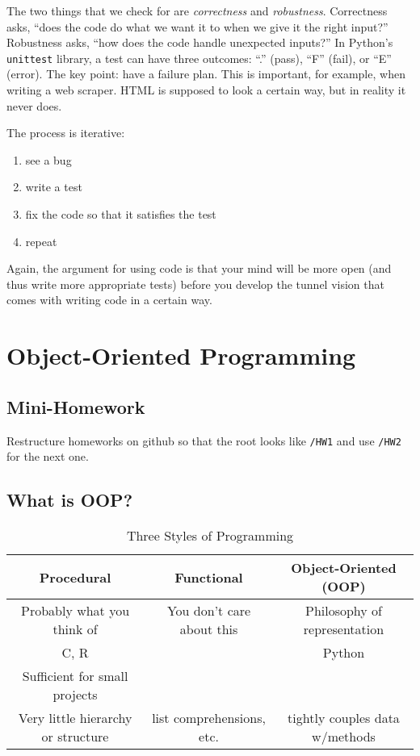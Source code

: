 \documentclass[12pt,letter]{article}
\begin{document}

The two things that we check for are \emph{correctness} and
\emph{robustness}. Correctness asks, ``does the code do what we want it
to when we give it the right input?'' Robustness asks, ``how does the
code handle unexpected inputs?'' In Python's \texttt{unittest} library, a test can have three
outcomes: ``.'' (pass), ``F'' (fail), or ``E'' (error). The key point:
have a failure plan. This is important, for example, when writing a
web scraper. HTML is supposed to look a certain way, but in reality it
never does. 

The process is iterative: 
\begin{enumerate}
\item see a bug
\item write a test
\item fix the code so that it satisfies the test
\item repeat
\end{enumerate}

Again, the argument for using code is that your mind will be more open
(and thus write more appropriate tests) before you develop the tunnel
vision that comes with writing code in a certain way. 

\newpage
\section{Object-Oriented Programming}

\subsection{Mini-Homework}
Restructure homeworks on github so that the root looks like \texttt{/HW1} and
use \texttt{/HW2} for the next one.

\subsection{What is OOP?}
\begin{table}[h!]
\begin{center}
\caption{Three Styles of Programming}
\begin{tabular}{ccc}
\\
Procedural & Functional & Object-Oriented (OOP) \\
\hline
Probably what you think of & You don't care about this & Philosophy of
representation\\
C, R & & Python\\
Sufficient for small projects & &  \\
Very little hierarchy or structure & list comprehensions, etc. &
tightly couples data w/methods \\
\end{tabular}
\end{center}
\end{table}
\end{document}
